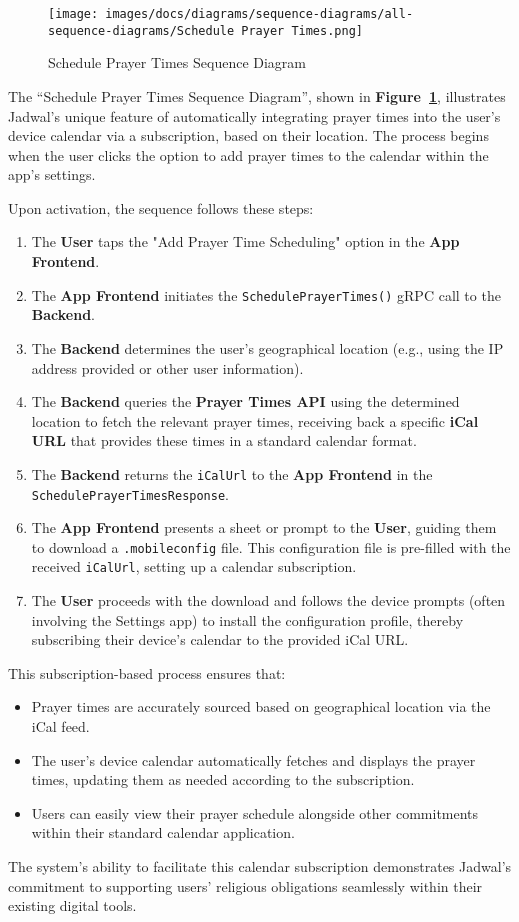 \begin{figure}[!h]
  \centering
  \texttt{[image: images/docs/diagrams/sequence-diagrams/all-sequence-diagrams/Schedule Prayer Times.png]}
  \caption{Schedule Prayer Times Sequence Diagram}
  \label{fig:seq/schedule-prayer-times}
\end{figure}

The ``Schedule Prayer Times Sequence Diagram'', shown in \textbf{Figure~\ref{fig:seq/schedule-prayer-times}}, illustrates Jadwal's unique feature of automatically integrating prayer times into the user's device calendar via a subscription, based on their location. The process begins when the user clicks the option to add prayer times to the calendar within the app's settings.

Upon activation, the sequence follows these steps:
\begin{enumerate}
  \item The \textbf{User} taps the "Add Prayer Time Scheduling" option in the \textbf{App Frontend}.
  \item The \textbf{App Frontend} initiates the \texttt{SchedulePrayerTimes()} gRPC call to the \textbf{Backend}.
  \item The \textbf{Backend} determines the user's geographical location (e.g., using the IP address provided or other user information).
  \item The \textbf{Backend} queries the \textbf{Prayer Times API} using the determined location to fetch the relevant prayer times, receiving back a specific \textbf{iCal URL} that provides these times in a standard calendar format.
  \item The \textbf{Backend} returns the \texttt{iCalUrl} to the \textbf{App Frontend} in the \texttt{SchedulePrayerTimesResponse}.
  \item The \textbf{App Frontend} presents a sheet or prompt to the \textbf{User}, guiding them to download a \texttt{.mobileconfig} file. This configuration file is pre-filled with the received \texttt{iCalUrl}, setting up a calendar subscription.
  \item The \textbf{User} proceeds with the download and follows the device prompts (often involving the Settings app) to install the configuration profile, thereby subscribing their device's calendar to the provided iCal URL.
\end{enumerate}

This subscription-based process ensures that:
\begin{itemize}
  \item Prayer times are accurately sourced based on geographical location via the iCal feed.
  \item The user's device calendar automatically fetches and displays the prayer times, updating them as needed according to the subscription.
  \item Users can easily view their prayer schedule alongside other commitments within their standard calendar application.
\end{itemize}

The system's ability to facilitate this calendar subscription demonstrates Jadwal's commitment to supporting users' religious obligations seamlessly within their existing digital tools.
